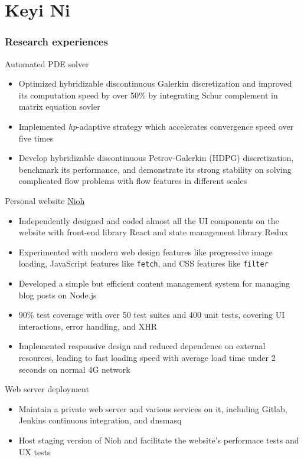 \documentclass{tccv}
\begin{document}
\part{Keyi Ni}

\section{Research experiences}

\begin{eventlist}
  {Automated PDE solver}
  \begin{itemize}[leftmargin=*]
  \item Optimized hybridizable discontinuous Galerkin discretization and improved its computation speed by over 50\% by integrating Schur complement in matrix equation sovler
  \item Implemented \textit{hp}-adaptive strategy which accelerates convergence speed over five times
  \item Develop hybridizable discontinuous Petrov-Galerkin (HDPG) discretization, benchmark its performance, and demonstrate its strong stability on solving complicated flow problems with flow features in different scales
  \end{itemize}
  
  {Personal website \href{https://www.nioh.ca}{Nioh}}
  \begin{itemize}
    \item Independently designed and coded almost all the UI components on the website with front-end library React and state management library Redux
    \item Experimented with modern web design features like progressive image loading, JavaScript features like \texttt{fetch}, and CSS features like \texttt{filter}
    \item Developed a simple but efficient content management system for managing blog posts on Node.js
    \item 90\% test coverage with over 50 test suites and 400 unit tests, covering UI interactions, error handling, and XHR
    \item Implemented responsive design and reduced dependence on external resources, leading to fast loading speed with average load time under 2 seconds on normal 4G network
  \end{itemize}

  {Web server deployment}
  \begin{itemize}
    \item Maintain a private web server and various services on it, including Gitlab, Jenkins continuous integration, and dnsmasq
    \item Host staging version of Nioh and facilitate the website’s performace tests and UX tests
  \end{itemize}


\end{eventlist}
\end{document}
